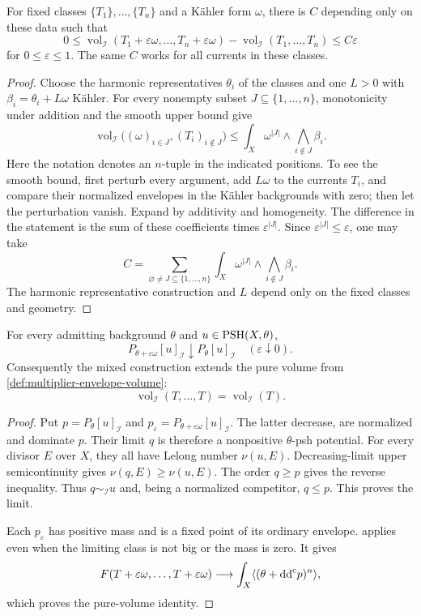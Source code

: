 \begin{lemma}\label{lem:mixed-multiplier-volume-perturbation-bound}
For fixed classes $\{T_1\},\ldots,\{T_n\}$ and a K\"ahler form $\omega$, there is $C$ depending only on these data such that
\[
 0\leq\operatorname{vol}_{\mathcal I}(T_1+\varepsilon\omega,\ldots,T_n+\varepsilon\omega)
       -\operatorname{vol}_{\mathcal I}(T_1,\ldots,T_n)\leq C\varepsilon
\]
for $0\leq\varepsilon\leq1$. The same $C$ works for all currents in these classes.
\end{lemma}
\begin{proof}
Choose the harmonic representatives $\theta_i$ of the classes and one $L>0$ with $\beta_i=\theta_i+L\omega$ K\"ahler. For every nonempty subset $J\subseteq\{1,\ldots,n\}$, monotonicity under addition and the smooth upper bound give
\[
 \operatorname{vol}_{\mathcal I}\bigl((\omega)_{i\in J},(T_i)_{i\notin J}\bigr)
               \leq\int_X\omega^{|J|}\wedge\bigwedge_{i\notin J}\beta_i.
\]
Here the notation denotes an $n$-tuple in the indicated positions. To see the smooth bound, first perturb every argument, add $L\omega$ to the currents $T_i$, and compare their normalized envelopes in the K\"ahler backgrounds with zero; then let the perturbation vanish. Expand by additivity and homogeneity. The difference in the statement is the sum of these coefficients times $\varepsilon^{|J|}$. Since $\varepsilon^{|J|}\leq\varepsilon$, one may take
\[
 C=\sum_{\varnothing\ne J\subseteq\{1,\ldots,n\}}
          \int_X\omega^{|J|}\wedge\bigwedge_{i\notin J}\beta_i.
\]
The harmonic representative construction and $L$ depend only on the fixed classes and geometry.
\end{proof}

\begin{proposition}\label{prop:multiplier-envelope-boundary-background-limit}
For every admitting background $\theta$ and $u\in\mathrm{PSH}(X,\theta)$,
\[
 P_{\theta+\varepsilon\omega}[u]_{\mathcal I}\downarrow P_\theta[u]_{\mathcal I}
                         \quad(\varepsilon\downarrow0).
\]
Consequently the mixed construction extends the pure volume from \cref{def:multiplier-envelope-volume}:
\[
 \operatorname{vol}_{\mathcal I}(T,\ldots,T)=\operatorname{vol}_{\mathcal I}(T).
\]
\end{proposition}
\begin{proof}
Put $p=P_\theta[u]_{\mathcal I}$ and $p_\varepsilon=P_{\theta+\varepsilon\omega}[u]_{\mathcal I}$. The latter decrease, are normalized and dominate $p$. Their limit $q$ is therefore a nonpositive $\theta$-psh potential. For every divisor $E$ over $X$, they all have Lelong number $\nu(u,E)$. Decreasing-limit upper semicontinuity gives $\nu(q,E)\geq\nu(u,E)$. The order $q\geq p$ gives the reverse inequality. Thus $q\sim_{\mathcal I}u$ and, being a normalized competitor, $q\leq p$. This proves the limit.

Each $p_\varepsilon$ has positive mass and is a fixed point of its ordinary envelope.  applies even when the limiting class is not big or the mass is zero. It gives
\[
 F(T+\varepsilon\omega,\ldots,T+\varepsilon\omega)
       \longrightarrow\int_X\langle(\theta+\mathrm{dd}^{\mathrm{c}} p)^n\rangle,
\]
which proves the pure-volume identity.
\end{proof}

